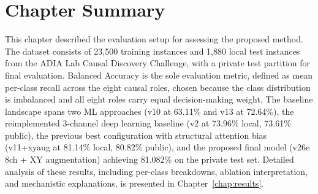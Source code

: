 \section*{Chapter Summary}

This chapter described the evaluation setup for assessing the proposed method. The dataset consists of 23,500 training instances and 1,880 local test instances from the ADIA Lab Causal Discovery Challenge, with a private test partition for final evaluation. Balanced Accuracy is the sole evaluation metric, defined as mean per-class recall across the eight causal roles, chosen because the class distribution is imbalanced and all eight roles carry equal decision-making weight. The baseline landscape spans two ML approaches (v10 at 63.11\% and v13 at 72.64\%), the reimplemented 3-channel deep learning baseline (v2 at 73.96\% local, 73.61\% public), the previous best configuration with structural attention bias (v11+xyaug at 81.14\% local, 80.82\% public), and the proposed final model (v26e 8ch + XY augmentation) achieving 81.082\% on the private test set. Detailed analysis of these results, including per-class breakdowns, ablation interpretation, and mechanistic explanations, is presented in Chapter~\ref{chap:results}.